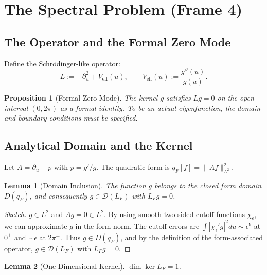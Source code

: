 \documentclass[12pt,a4paper]{article}
\newtheorem{proposition}{Proposition}
\newtheorem{lemma}{Lemma}
\begin{document}
\section{The Spectral Problem (Frame 4)}\label{sec:spectral}

\subsection{The Operator and the Formal Zero Mode}
Define the Schr\"odinger-like operator:
\begin{equation}\label{eq:L}
L := -\partial_u^2 + V_{\text{eff}}(u), \qquad V_{\text{eff}}(u) := \frac{g''(u)}{g(u)}.
\end{equation}

\begin{proposition}[Formal Zero Mode]\label{prop:zero}
The kernel \(g\) satisfies \(Lg = 0\) on the open interval \((0, 2\pi)\) as a formal identity. To be an actual eigenfunction, the domain and boundary conditions must be specified.
\end{proposition}

\subsection{Analytical Domain and the Kernel}
Let \(A = \partial_u - p\) with \(p = g'/g\). The quadratic form is \(q_F[f] = \|Af\|_{L^2}^2\). 

\begin{lemma}[Domain Inclusion]\label{lem:domain}
The function \(g\) belongs to the closed form domain \(D(q_F)\), and consequently \(g \in \mathcal{D}(L_F)\) with \(L_F g = 0\).
\end{lemma}
\begin{proof}[Sketch]
\(g \in L^2\) and \(Ag = 0 \in L^2\). By using smooth two-sided cutoff functions \(\chi_\epsilon\), we can approximate \(g\) in the form norm. The cutoff errors are \(\int |\chi_\epsilon' g|^2 du \sim \epsilon^9\) at \(0^+\) and \(\sim \epsilon\) at \(2\pi^-\). Thus \(g \in D(q_F)\), and by the definition of the form-associated operator, \(g \in \mathcal{D}(L_F)\) with \(L_F g = 0\).
\end{proof}

\begin{lemma}[One-Dimensional Kernel]\label{lem:kernel}
\(\dim \ker L_F = 1\).
\end{lemma}
\end{document}
